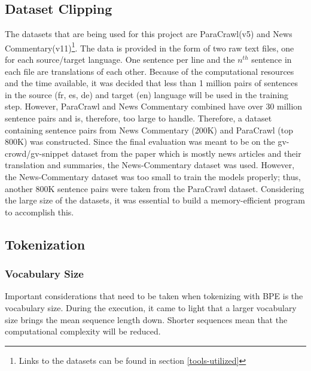 \documentclass[12pt,a4paper,twoside,openright]{report}
\begin{document}
\subsection{Dataset Clipping}
\label{dataset-clipping}
The datasets that are being used for this project are ParaCrawl(v5) and News Commentary(v11)\footnote{Links to the datasets can be found in section \ref{tools-utilized} }. The data is provided in the form of two raw text files, one for each source/target language. One sentence per line and the $n^{th}$ sentence in each file are translations of each other. Because of the computational resources and the time available, it was decided that less than 1 million pairs of sentences in the source (fr, es, de) and target (en) language will be used in the training step. However, ParaCrawl and News Commentary combined have over 30 million sentence pairs and is, therefore, too large to handle. Therefore, a dataset containing sentence pairs from News Commentary (200K) and ParaCrawl (top 800K) was constructed. Since the final evaluation was meant to be on the gv-crowd/gv-snippet dataset from the paper \cite{nguyen-daume-iii-2019-global} which is mostly news articles and their translation and summaries, the News-Commentary dataset was used. However, the News-Commentary dataset was too small to train the models properly; thus, another 800K sentence pairs were taken from the ParaCrawl dataset. Considering the large size of the datasets, it was essential to build a memory-efficient program to accomplish this. 



\subsection{Tokenization}
\label{tokenization}

\subsubsection{Vocabulary Size}
Important considerations that need to be taken when tokenizing with BPE is the vocabulary size. During the execution, it came to light that a larger vocabulary size brings the mean sequence length down. Shorter sequences mean that the computational complexity will be reduced. 
\end{document}
